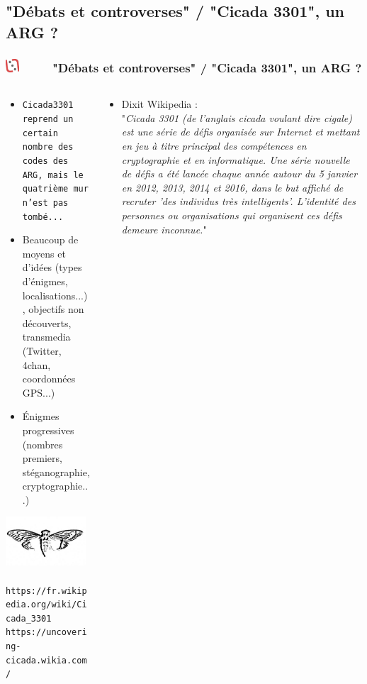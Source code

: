 \documentclass[slidetop,11pt]{beamer}
\def\moreInFrameTitleLeftt{\includegraphics[height=0.5cm]{img/ligueludique-0.png}~~~~~}
\begin{document}
\def\sectionPartIIIe{"D{\'e}bats et controverses" / "Cicada 3301", un ARG ?}
\subsection{\sectionPartIIIe}
\begin{frame}
	\frametitle{\moreInFrameTitleLeftt \sectionPartIIIe}
	\begin{columns}[T]
		\begin{column}[T]{5.10cm}
			\begin{itemize}
				\scriptsize 
				\item \texttt{\footnotesize Cicada3301 reprend un certain nombre des codes des ARG, mais le quatri{\`e}me mur n'est pas tomb{\'e}...}
				\item Beaucoup de moyens et d'id{\'e}es (types d'{\'e}nigmes, localisations...), objectifs non d{\'e}couverts, transmedia (Twitter, 4chan, coordonn{\'e}es GPS...)
				\item {\'E}nigmes progressives (nombres premiers, st{\'e}ganographie, cryptographie...)
			\end{itemize}
			\includegraphics[width=3.00cm]{img/cicada3301/Cicada_3301_logo.jpg}~\\
			\texttt{\scriptsize https://fr.wikipedia.org/wiki/Cicada\_3301}~\\
			\texttt{\scriptsize \mbox{https://uncovering-cicada.wikia.com/}}
		\end{column}
		\begin{column}[T]{5.00cm}
			\begin{itemize}
				\footnotesize 
				\item Dixit Wikipedia : ~\\
					"\emph{\sloppy Cicada 3301 (de l'anglais cicada voulant dire cigale) est une s{\'e}rie de d{\'e}fis organis{\'e}e sur Internet et mettant en jeu {\`a} titre principal des comp{\'e}tences en cryptographie et en informatique. Une s{\'e}rie nouvelle de d{\'e}fis a {\'e}t{\'e} lanc{\'e}e chaque ann{\'e}e autour du 5 janvier en 2012, 2013, 2014 et 2016, dans le but affich{\'e} de recruter 'des individus tr{\`e}s intelligents'. L'identit{\'e} des personnes ou organisations qui organisent ces d{\'e}fis demeure inconnue.}"
			\end{itemize}
		\end{column}
	\end{columns}
\end{frame}
\end{document}
